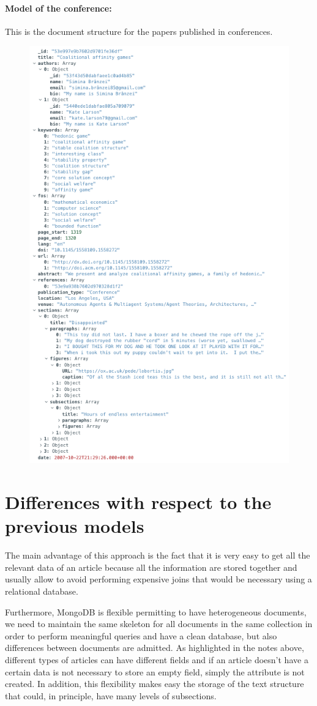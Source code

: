 \paragraph{Model of the conference:}
This is the document structure for the papers published in conferences.
\begin{figure}[H]
    \begin{center}
        \includegraphics[width=0.6\linewidth]{ImagesMongoDB/conference}
        \label{fig:conference}%
    \end{center}
\end{figure}


\section{Differences with respect to the previous models}
\label{sec:differences_with_respect_to_the_previous_models}%
The main advantage of this approach is the fact that it is very easy to get all the relevant data of an article because all the information are stored together and usually allow to avoid performing expensive joins that would be necessary using a relational database.

Furthermore, MongoDB is flexible permitting to have heterogeneous documents, we need to maintain the same skeleton for all documents in the same collection in order to perform meaningful queries and have a clean database, but also differences between documents are admitted.
As highlighted in the notes above, different types of articles can have different fields and if an article doesn't have a certain data is not necessary to store an empty field, simply the attribute is not created.
In addition, this flexibility makes easy the storage of the text structure that could, in principle, have many levels of subsections.

